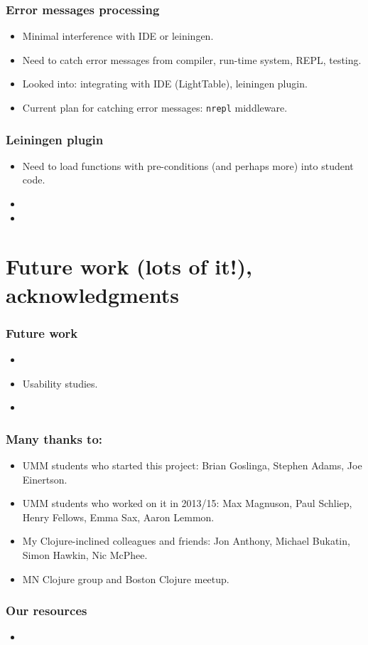 \documentclass{beamer}
\begin{document}
\begin{frame}
   \frametitle{Error messages processing}
\begin{itemize}
\item Minimal interference with IDE or leiningen.
\item Need to catch error messages from compiler,  run-time system, REPL, testing.
\item Looked into: integrating with IDE (LightTable), leiningen plugin. 
\item Current plan for catching error messages: {\tt nrepl} middleware. 
\end{itemize}
\end{frame}

\begin{frame}
   \frametitle{Leiningen plugin}
\begin{itemize}
\item Need to load functions with pre-conditions (and perhaps more) into student code. 
\item 
\item 
\end{itemize}
\end{frame}

\section{Future work (lots of it!), acknowledgments}

\begin{frame}
   \frametitle{Future work}
\begin{itemize}
\item 
\item Usability studies. 
\item 
\end{itemize}
\end{frame}

\begin{frame}
   \frametitle{Many thanks to:}
\begin{itemize}
\item UMM students who started this project: Brian Goslinga, Stephen Adams, Joe Einertson. 
\item UMM students who worked on it in 2013/15: Max Magnuson, Paul Schliep, Henry Fellows, Emma Sax, Aaron Lemmon. 
\item My Clojure-inclined colleagues and friends: Jon Anthony, Michael Bukatin, Simon Hawkin, Nic McPhee. 
\item MN Clojure group and Boston Clojure meetup. 
\end{itemize}
\end{frame}

\begin{frame}
   \frametitle{Our resources}
\begin{itemize}
\item 
\end{itemize}
\end{frame}
\end{document}
